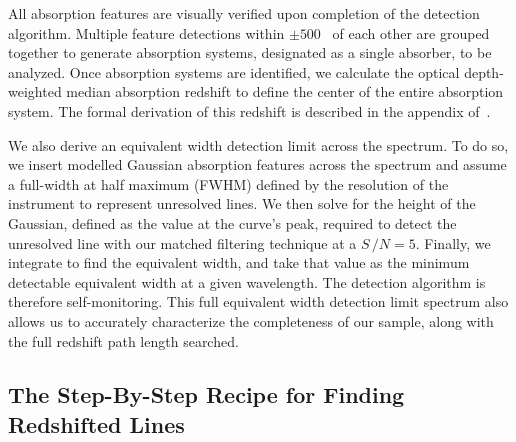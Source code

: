 All absorption features are visually verified upon completion of the detection algorithm. Multiple feature detections within $\pm 500$~{\kms} of each other are grouped together to generate absorption systems, designated as a single absorber, to be analyzed. Once absorption systems are identified, we calculate the optical depth-weighted median absorption redshift to define the center of the entire absorption system. The formal derivation of this redshift is described in the appendix of~\cite{Churchill2001}.

We also derive an equivalent width detection limit across the spectrum. To do so, we insert modelled Gaussian absorption features across the spectrum and assume a full-width at half maximum (FWHM) defined by the resolution of the instrument to represent unresolved lines. We then solve for the height of the Gaussian, defined as the value at the curve's peak, required to detect the unresolved line with our matched filtering technique at a $S\,/N = 5$. Finally, we integrate to find the equivalent width, and take that value as the minimum detectable equivalent width at a given wavelength. The detection algorithm is therefore self-monitoring. This full equivalent width detection limit spectrum also allows us to accurately characterize the completeness of our sample, along with the full redshift path length searched.

\subsection{The Step-By-Step Recipe for Finding Redshifted Lines}
\label{ch3:steps}

